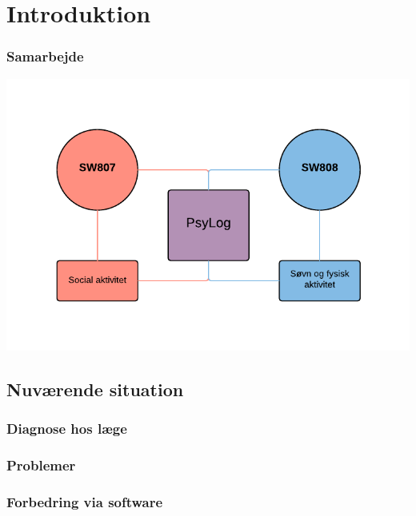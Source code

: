 \section{Introduktion}

\begin{frame}
\frametitle{Samarbejde}

\includegraphics[width=\textwidth]{graphics/samarbejde.pdf}

\end{frame}

\subsection{Nuværende situation}

\begin{frame}
\frametitle{Diagnose hos læge}

\end{frame}

\begin{frame}
\frametitle{Problemer}

\end{frame}

\begin{frame}
\frametitle{Forbedring via software}

\end{frame}
